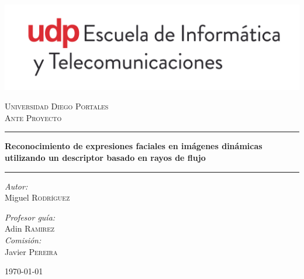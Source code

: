 \documentclass{article}
\begin{document}
\begin{titlepage}

\begin{center}


\includegraphics[width=.8\textwidth]{./inf_tele.jpg}


\textsc{\LARGE Universidad Diego Portales}\\[1.5cm]


\textsc{\Large Ante Proyecto}\\[0.5cm]



\rule{1\textwidth}{.4pt}


{ \huge \bfseries Reconocimiento de expresiones faciales en imágenes dinámicas utilizando un descriptor basado en rayos de flujo \\[0.4cm] }


\rule{1\textwidth}{.4pt}\newline\newline\newline\newline
\begin{minipage}{0.4\textwidth}
\begin{flushleft} \large
\emph{Autor:}\\
Miguel \textsc{Rodríguez}
\end{flushleft}
\end{minipage}
\begin{minipage}{0.4\textwidth}
\begin{flushright} \large
\emph{Profesor guía:} \\
Adin \textsc{Ramirez}\\
\emph{Comisión:} \\
Javier \textsc{Pereira}
\end{flushright}
\end{minipage}


\vfill



{\large \today}


\end{center}

\end{titlepage}
\end{document}
